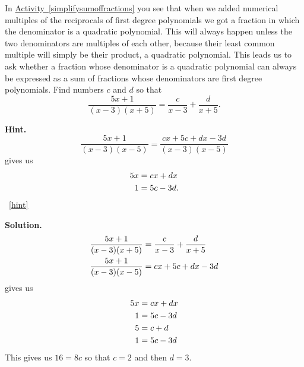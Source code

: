 \documentclass{book}
\begin{document}
\setcounter{project}{264}
\addtocounter{project}{-1}
\begin{activity}[]\label{partialfractionsintro}
\hypertarget{p-1384}{}%
In \hyperref[simplifysumoffractions]{Activity~\ref{simplifysumoffractions}} you see that when we added numerical multiples of the reciprocals of first degree polynomials we got a fraction in which the denominator is a quadratic polynomial. This will always happen unless the two denominators are multiples of each other, because their least common multiple will simply be their product, a quadratic polynomial. This leads us to ask whether a fraction whose denominator is a quadratic polynomial can always be expressed as a sum of fractions whose denominators are first degree polynomials. Find numbers \(c\) and \(d\) so that%
\begin{equation*}
\frac{5x+1}{(x-3)(x+5)} = \frac{c}{x-3} + \frac{d}{x+5}.
\end{equation*}
%
\par\smallskip%
\noindent\textbf{Hint.}\hypertarget{hint-169}{}\quad%
\hypertarget{p-1385}{}%
%
\begin{equation*}
\frac{5x+1}{(x-3)(x-5)} = \frac{cx+5c+dx-3d}{(x-3)(x-5)}
\end{equation*}
gives us%
\begin{align*}
5x & = cx+dx\\
1 &= 5c-3d\text{.}
\end{align*}
%
~\hfill{\tiny\hyperlink{a-264}{[hint]}\hypertarget{q-264}{}}\par\smallskip%
\noindent\textbf{Solution.}\hypertarget{solution-176}{}\quad%
\hypertarget{p-1386}{}%
%
\begin{align*}
\frac{5x+1}{(x-3)(x+5)}  &=  \frac{c}{x-3} + \frac{d}{x+5}\\
\frac{5x+1}{(x-3)(x-5)}  &= cx+5c+dx-3d
\end{align*}
gives us%
\begin{align*}
5x &= cx+dx\\
1 &= 5c-3d\\
5 &= c+d\\
1 &= 5c-3d
\end{align*}
This gives us \(16=8c\) so that \(c=2\) and then \(d=3\).%
\end{activity}
\end{document}
